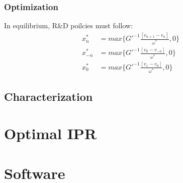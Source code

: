 \documentclass{beamer}
\begin{document}
\begin{frame}[t]\frametitle{Optimization} 
  In equilibrium, R\&D poilcies must follow:
  \begin{align*} \label{eq:ss_rd_policies}
    x_n^*    &= max \big\{G'^{-1}\frac{[v_{n+1} - v_n]}{\omega^*}   ,0\}\\
    x_{-n}^* &= max \big\{G'^{-1}\frac{[v_0  - v_{-n}]}{\omega^*}   ,0\}\\
    x_0^*    &= max \big\{G'^{-1}\frac{[v_1     - v_0]}{\omega^*}   ,0\}
  \end{align*}
\end{frame}

\subsection{Characterization}
\label{sub:characterization}

\section{Optimal IPR}
\label{sec:optimal_ipr}


\section{Software}
\label{sec:software}
\end{document}
